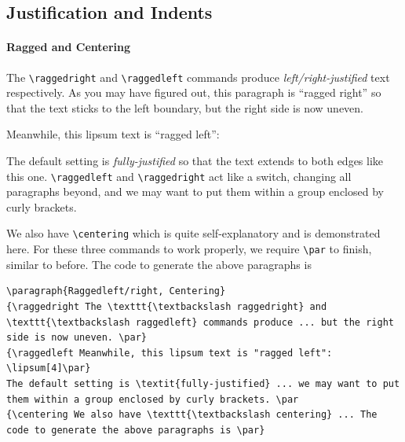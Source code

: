 \subsection{Justification and Indents}

\paragraph{Ragged and Centering}
{\raggedright The \texttt{\textbackslash raggedright} and \texttt{\textbackslash raggedleft} commands produce \textit{left/right-justified} text respectively. As you may have figured out, this paragraph is “ragged right” so that the text sticks to the left boundary, but the right side is now uneven. \par}
{\raggedleft Meanwhile, this lipsum text is “ragged left”: \lipsum[4]\par}
The default setting is \textit{fully-justified} so that the text extends to both edges like this one. \texttt{\textbackslash raggedleft} and \texttt{\textbackslash raggedright} act like a switch, changing all paragraphs beyond, and we may want to put them within a group enclosed by curly brackets. \par
{\centering We also have \texttt{\textbackslash centering} which is quite self-explanatory and is demonstrated here. For these three commands to work properly, we require \texttt{\textbackslash par} to finish, similar to before. The code to generate the above paragraphs is \par}
\begin{lstlisting}
\paragraph{Raggedleft/right, Centering}
{\raggedright The \texttt{\textbackslash raggedright} and \texttt{\textbackslash raggedleft} commands produce ... but the right side is now uneven. \par}
{\raggedleft Meanwhile, this lipsum text is "ragged left": \lipsum[4]\par}
The default setting is \textit{fully-justified} ... we may want to put them within a group enclosed by curly brackets. \par
{\centering We also have \texttt{\textbackslash centering} ... The code to generate the above paragraphs is \par}
\end{lstlisting}

